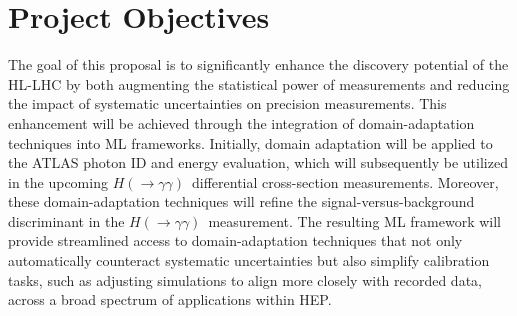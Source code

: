 \documentclass[letter, USenglish, 11pt, subfigure]{article}
\newcommand{\hyy}{\ensuremath{H(\to\gamma\gamma)}}
\begin{document}
\section{Project Objectives}

The goal of this proposal is to significantly enhance the discovery potential of the HL-LHC by both augmenting the statistical power of measurements and reducing the impact of systematic uncertainties on precision measurements. This enhancement will be achieved through the integration of domain-adaptation techniques into ML frameworks. Initially, domain adaptation will be applied to the ATLAS photon ID and energy evaluation, which will subsequently be utilized in the upcoming \hyy\ differential cross-section measurements. Moreover, these domain-adaptation techniques will refine the signal-versus-background discriminant in the \hyy\ measurement. The resulting ML framework will provide streamlined access to domain-adaptation techniques that not only automatically counteract systematic uncertainties but also simplify calibration tasks, such as adjusting simulations to align more closely with recorded data, across a broad spectrum of applications within HEP.
\end{document}
